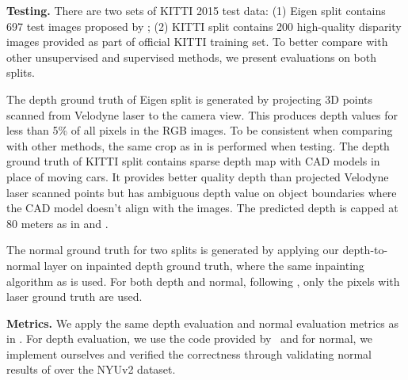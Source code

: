 \textbf{Testing.}
There are two sets of KITTI 2015 test data: (1) Eigen split contains 697 test images proposed by \cite{eigen2014depth}; (2) KITTI split contains 200 high-quality disparity images provided as part of official KITTI training set.  To better compare with other unsupervised and supervised methods, we present evaluations on both splits. 

The depth ground truth of Eigen split is generated by projecting 3D points scanned from Velodyne laser to the camera view. This produces depth values for less than 5\% of all pixels in the RGB images. To be consistent when comparing with other methods, the same crop as in \cite{eigen2014depth} is performed when testing. The depth ground truth of KITTI split contains sparse depth map with CAD models in place of moving cars. It provides better quality depth than projected Velodyne laser scanned points but has ambiguous depth value on object boundaries where the CAD model doesn't align with the images. The predicted depth is capped at 80 meters as in \cite{godard2016unsupervised} and \cite{zhou2017unsupervised}.

The normal ground truth for two splits is generated by applying our depth-to-normal layer on inpainted depth ground truth, where the same inpainting algorithm as \cite{silberman2012indoor} is used. For both depth and normal, following \cite{eigen2014depth}, only the pixels with laser ground truth are used.

\textbf{Metrics.} We apply the same depth evaluation and normal evaluation metrics as in \cite{eigen2015predicting}. For depth evaluation, we use the code provided by~\cite{zhou2017unsupervised} and for normal, we implement ourselves and verified the correctness through validating normal results of \cite{eigen2015predicting} over the NYUv2 dataset.







